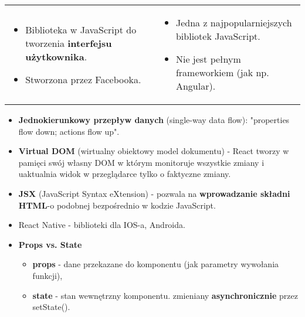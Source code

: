 \documentclass[../main.tex]{subfiles}
\begin{document}
    \begin{table}[H]
        \begin{center}
            \begin{tabular}{p{7cm} p{9cm}}
                \begin{itemize}
                    \item Biblioteka w JavaScript do tworzenia \textbf{interfejsu użytkownika}.
                    \item Stworzona przez Facebooka.
                \end{itemize}
                &
                \begin{itemize}
                    \item Jedna z najpopularniejszych bibliotek JavaScript.
                    \item Nie jest pełnym frameworkiem (jak np. Angular).
                \end{itemize}
            \end{tabular}
        \end{center}
    \end{table}
    \begin{itemize}
        \item \textbf{Jednokierunkowy przepływ danych} (single-way data flow): "properties flow down; actions flow up".
        \item \textbf{Virtual DOM} (wirtualny obiektowy model dokumentu) - React tworzy w pamięci swój własny DOM w którym monitoruje
        wszystkie zmiany i uaktualnia widok w przeglądarce tylko o faktyczne zmiany.
        \item \textbf{JSX} (JavaScript Syntax eXtension) - pozwala na \textbf{wprowadzanie składni HTML}-o podobnej bezpośrednio w kodzie JavaScript.
        \item React Native - biblioteki dla IOS-a, Androida.
        \item \textbf{Props vs. State}
        \begin{itemize}
            \item \textbf{props} - dane przekazane do komponentu (jak parametry wywołania funkcji),
            \item \textbf{state} - stan wewnętrzny komponentu. zmieniany \textbf{asynchronicznie} przez setState().
        \end{itemize}
    \end{itemize}
\end{document}
